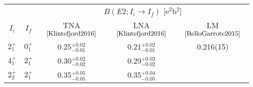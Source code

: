 \begin{tabular}{ccccc}
\hline
        &         & \multicolumn{3}{c}{$B(E2; I_i \rightarrow I_f)$ [e$^2$b$^2$]} \\
$I_i$   & $I_f$   & TNA $\cite{Klintefjord2016}$ & LNA $\cite{Klintefjord2016}$ & LM $\cite{BelloGarrote2015}$ \\
\hline
$2_1^+$ & $0_1^+$ & 0.25$_{-0.01}^{+0.02}$       & 0.21$_{-0.01}^{+0.02}$       & 0.216(15)                    \\
$4_1^+$ & $2_1^+$ & 0.30$_{-0.02}^{+0.02}$       & 0.29$_{-0.02}^{+0.02}$       &                              \\
$2_2^+$ & $2_1^+$ & 0.35$_{-0.05}^{+0.05}$       & 0.35$_{-0.05}^{+0.04}$       &                              \\
\hline
\end{tabular}